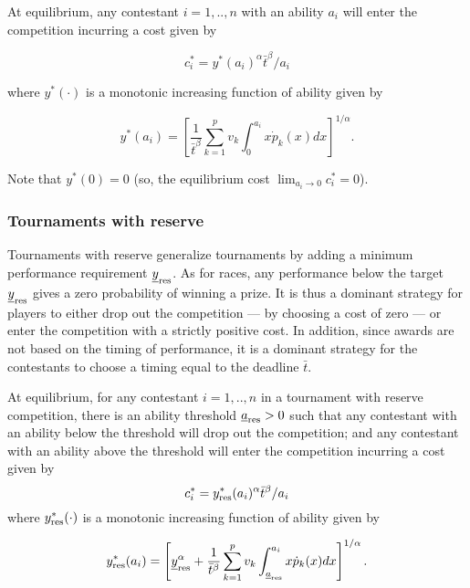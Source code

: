 \documentclass[10pt, titlepage]{article}
\newcommand\deadline{\bar{t}}
\newcommand\target{\underline{y}}
\begin{document}
At equilibrium, any contestant \(i=1, .., n\) with an ability \(a_i\)
will enter the competition incurring a cost given by

\begin{equation}
    \label{cost tournaments}
    c_i^* = y^*(a_i)^\alpha \deadline^\beta / a_i
\end{equation}

where \(y^*(\cdot)\) is a monotonic increasing function of ability given
by

\begin{equation}
        y^*(a_i) = 
        \left[\frac{1}{\deadline^\beta}\sum_{k=1}^{p} v_k \int_{0}^{a_i} x \dot p_k(x) d x \right]^{1/\alpha}. 
\end{equation}

Note that \(y^*(0)=0\) (so, the equilibrium cost
\(\lim_{a_i\to 0} c_i^* = 0\)).

\subsubsection{Tournaments with reserve}\label{tournaments-with-reserve}

Tournaments with reserve generalize tournaments by adding a minimum
performance requirement \(\target_{\reserve}\). As for races, any
performance below the target \(\target_{\reserve}\) gives a zero
probability of winning a prize. It is thus a dominant strategy for
players to either drop out the competition --- by choosing a cost of
zero --- or enter the competition with a strictly positive cost. In
addition, since awards are not based on the timing of performance, it is
a dominant strategy for the contestants to choose a timing equal to the
deadline \(\deadline\).

At equilibrium, for any contestant \(i=1, .., n\) in a tournament with
reserve competition, there is an ability threshold
\(\underline{a}_{\text{res}}>0\) such that any contestant with an ability below
the threshold will drop out the competition; and any contestant with an
ability above the threshold will enter the competition incurring a cost
given by \[
    c_i^* = y_\reserve^*(a_i)^\alpha \deadline^\beta / a_i
\] where \(y_{\text{res}}^*(\cdot)\) is a monotonic increasing function of
ability given by

\begin{equation}
        y_\reserve^*(a_i) = \left[
            \target_{\reserve}^\alpha + \frac{1}{\deadline^\beta}\sum_{k=1}^{p} v_k \int_{\marginal_\reserve}^{a_i} x \dot p_k(x) d x
        \right]^{1/\alpha}.
\end{equation}
\end{document}
